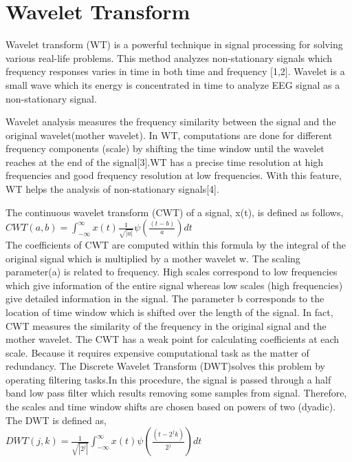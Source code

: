 \documentclass[12pt,letterpaper]{article}
\begin{document}
\section*{Wavelet Transform}

Wavelet transform (WT) is a powerful technique in signal processing for solving various real-life problems. This method analyzes non-stationary signals which frequency responses varies in time in both time and frequency [1,2]. Wavelet is a small wave which its energy is concentrated in time to analyze EEG signal as a non-stationary signal.

Wavelet analysis measures the frequency similarity between the signal and the original wavelet(mother wavelet).
In WT, computations are done for different frequency components (scale) by shifting the time window until the wavelet reaches at the end of the signal[3].WT has a precise time resolution at high frequencies and good frequency resolution at low frequencies. With this feature, WT helps the analysis of non-stationary signals[4].


The continuous wavelet transform (CWT) of a signal, x(t), is defined as follows,  \\
$CWT(a,b)=\int_{-\infty}^{\infty} x(t)\frac{1}{\sqrt{|a|}}\psi(\frac{(t-b)}{a})dt$ \\

The coefficients of CWT are computed within this formula by the integral of the original signal which is multiplied by a mother wavelet w. The scaling parameter(a) is related to frequency. High scales correspond to low frequencies which give information of the entire signal whereas low scales (high frequencies) give detailed information in the signal. The parameter b corresponds to the location of time window which is shifted over the length of the signal. In fact, CWT measures the similarity of the frequency in the original signal and the mother wavelet.
The CWT has a weak point for calculating coefficients at each scale. Because it requires expensive computational task as the matter of redundancy.   
The Discrete Wavelet Transform (DWT)solves this problem by operating filtering tasks.In this procedure, the signal is passed through a half band low pass filter which results removing some samples from signal. Therefore, the scales and time window shifts are chosen based on powers of two (dyadic). The DWT is defined as,\\  

$DWT(j,k)=\frac{1}{\sqrt{|2^j|}}\int_{-\infty}^{\infty}x(t)\psi(\frac{(t-2^jk)}{2^j})dt$\\
\end{document}
